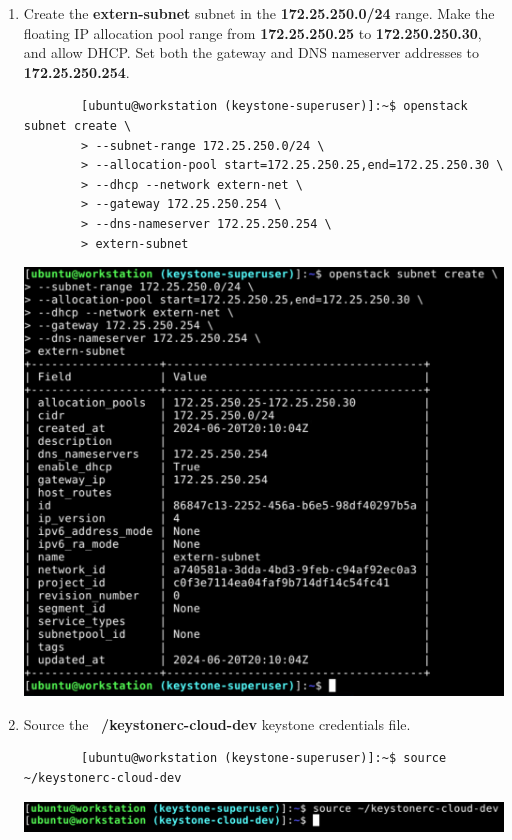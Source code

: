 \documentclass[letterpaper, 12pt]{article}
\begin{document}
\begin{enumerate}
    \item Create the \textbf{extern-subnet} subnet in the \textbf{172.25.250.0/24} range. Make the floating IP
    allocation pool range from \textbf{172.25.250.25} to \textbf{172.250.250.30}, and allow DHCP. Set both the gateway
    and DNS nameserver addresses to \textbf{172.25.250.254}.
    \begin{lstlisting}
        [ubuntu@workstation (keystone-superuser)]:~$ openstack subnet create \
        > --subnet-range 172.25.250.0/24 \
        > --allocation-pool start=172.25.250.25,end=172.25.250.30 \
        > --dhcp --network extern-net \
        > --gateway 172.25.250.254 \
        > --dns-nameserver 172.25.250.254 \
        > extern-subnet
    \end{lstlisting}

    \begin{center}
        \includegraphics[width=\linewidth]{images/part1/step22.png}
    \end{center}

    \item Source the \textbf{~/keystonerc-cloud-dev} keystone credentials file.
    \begin{lstlisting}
        [ubuntu@workstation (keystone-superuser)]:~$ source ~/keystonerc-cloud-dev
    \end{lstlisting}

    \begin{center}
        \includegraphics[width=\linewidth]{images/part1/step23.png}
    \end{center}


\end{enumerate}
\end{document}
